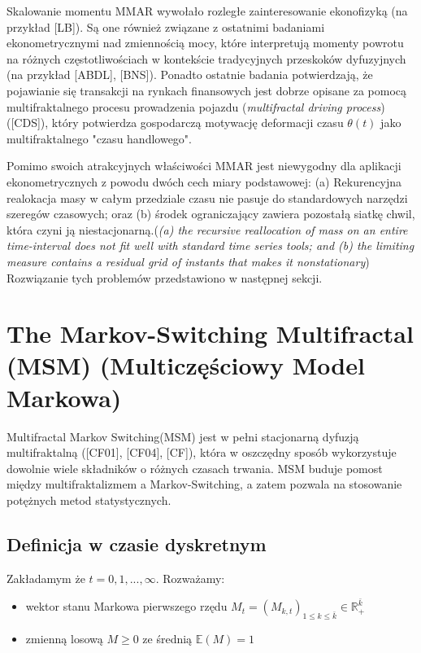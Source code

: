 \documentclass[12pt]{article}
\theoremstyle{definition}
\begin{document}
Skalowanie momentu MMAR wywołało rozległe zainteresowanie ekonofizyką (na przykład [LB]). Są one również związane z ostatnimi badaniami ekonometrycznymi nad zmiennością mocy, które interpretują momenty powrotu na różnych częstotliwościach w kontekście tradycyjnych przeskoków dyfuzyjnych (na przykład [ABDL], [BNS]). Ponadto ostatnie badania potwierdzają, że pojawianie się transakcji na rynkach finansowych jest dobrze opisane za pomocą multifraktalnego procesu prowadzenia pojazdu (\textsl{multifractal driving process}) ([CDS]), który potwierdza gospodarczą motywację deformacji czasu $\theta (t)$ jako multifraktalnego "czasu handlowego".

Pomimo swoich atrakcyjnych właściwości MMAR jest niewygodny dla aplikacji ekonometrycznych z powodu dwóch cech miary podstawowej: (a) Rekurencyjna realokacja masy w całym przedziale czasu nie pasuje do standardowych narzędzi szeregów czasowych; oraz (b) środek ograniczający zawiera pozostałą siatkę chwil, która czyni ją niestacjonarną.(\textsl{(a) the recursive reallocation of mass on an entire time-interval does not fit well with standard time series tools; and (b) the limiting measure contains a residual grid of instants that makes it nonstationary}) Rozwiązanie tych problemów przedstawiono w następnej sekcji.

\section{The Markov-Switching Multifractal (MSM) (Multiczęściowy Model Markowa)}

Multifractal Markov Switching(MSM) jest w pełni stacjonarną dyfuzją multifraktalną ([CF01], [CF04], [CF]), która w oszczędny sposób wykorzystuje dowolnie wiele składników o różnych czasach trwania. MSM buduje pomost między multifraktalizmem a Markov-Switching, a zatem pozwala na stosowanie potężnych metod statystycznych.
\subsection{Definicja w czasie dyskretnym}
Zakładamym że $t = 0, 1, ..., \infty$. Rozważamy:
\begin{itemize}
\item wektor stanu Markowa pierwszego rzędu $M_t = (M_{k, t})_{1 \leq k \leq \bar{k}} \in \mathbb{R}^{\bar{k}}_+$
\item zmienną losową $M \geq 0$ ze średnią $\mathbb{E}(M) = 1 $
\end{itemize}
\end{document}
